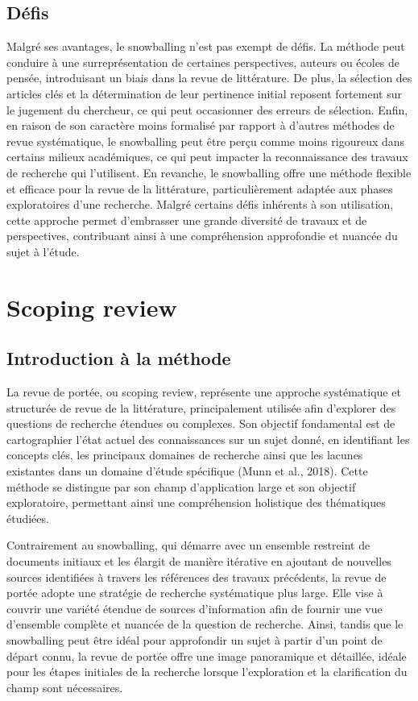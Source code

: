 \documentclass[
  letterpaper,
  DIV=11,
  numbers=noendperiod]{scrreprt}
\begin{document}
\subsection{Défis}\label{duxe9fis}

Malgré ses avantages, le snowballing n'est pas exempt de défis. La
méthode peut conduire à une surreprésentation de certaines perspectives,
auteurs ou écoles de pensée, introduisant un biais dans la revue de
littérature. De plus, la sélection des articles clés et la détermination
de leur pertinence initial reposent fortement sur le jugement du
chercheur, ce qui peut occasionner des erreurs de sélection. Enfin, en
raison de son caractère moins formalisé par rapport à d'autres méthodes
de revue systématique, le snowballing peut être perçu comme moins
rigoureux dans certains milieux académiques, ce qui peut impacter la
reconnaissance des travaux de recherche qui l'utilisent. En revanche, le
snowballing offre une méthode flexible et efficace pour la revue de la
littérature, particulièrement adaptée aux phases exploratoires d'une
recherche. Malgré certains défis inhérents à son utilisation, cette
approche permet d'embrasser une grande diversité de travaux et de
perspectives, contribuant ainsi à une compréhension approfondie et
nuancée du sujet à l'étude.

\section{Scoping review}\label{scoping-review}

\subsection{Introduction à la
méthode}\label{introduction-uxe0-la-muxe9thode-1}

La revue de portée, ou scoping review, représente une approche
systématique et structurée de revue de la littérature, principalement
utilisée afin d'explorer des questions de recherche étendues ou
complexes. Son objectif fondamental est de cartographier l'état actuel
des connaissances sur un sujet donné, en identifiant les concepts clés,
les principaux domaines de recherche ainsi que les lacunes existantes
dans un domaine d'étude spécifique (Munn et al., 2018). Cette méthode se
distingue par son champ d'application large et son objectif
exploratoire, permettant ainsi une compréhension holistique des
thématiques étudiées.

Contrairement au snowballing, qui démarre avec un ensemble restreint de
documents initiaux et les élargit de manière itérative en ajoutant de
nouvelles sources identifiées à travers les références des travaux
précédents, la revue de portée adopte une stratégie de recherche
systématique plus large. Elle vise à couvrir une variété étendue de
sources d'information afin de fournir une vue d'ensemble complète et
nuancée de la question de recherche. Ainsi, tandis que le snowballing
peut être idéal pour approfondir un sujet à partir d'un point de départ
connu, la revue de portée offre une image panoramique et détaillée,
idéale pour les étapes initiales de la recherche lorsque l'exploration
et la clarification du champ sont nécessaires.
\end{document}
